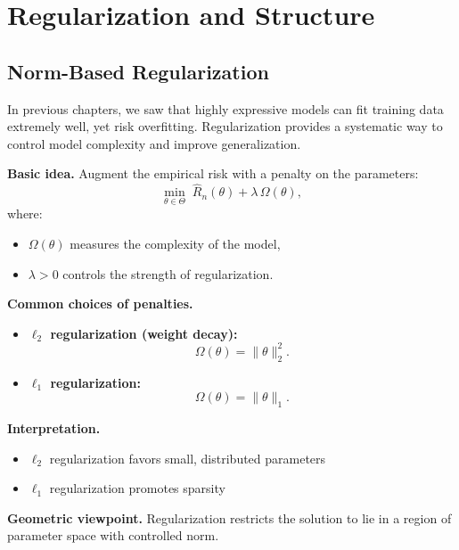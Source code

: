 \chapter{Regularization and Structure}

\section{Norm-Based Regularization}

In previous chapters, we saw that highly expressive models can fit training data extremely well, yet risk overfitting. Regularization provides a systematic way to control model complexity and improve generalization.

\medskip

\noindent
\textbf{Basic idea.}  
Augment the empirical risk with a penalty on the parameters:
\[
\min_{\theta \in \Theta} \; \hat{R}_n(\theta) + \lambda \, \Omega(\theta),
\]
where:
\begin{itemize}
    \item $\Omega(\theta)$ measures the complexity of the model,
    \item $\lambda > 0$ controls the strength of regularization.
\end{itemize}

\medskip

\noindent
\textbf{Common choices of penalties.}

\begin{itemize}
    \item \textbf{$\ell_2$ regularization (weight decay):}
    \[
    \Omega(\theta) = \|\theta\|_2^2.
    \]

    \item \textbf{$\ell_1$ regularization:}
    \[
    \Omega(\theta) = \|\theta\|_1.
    \]
\end{itemize}

\medskip

\noindent
\textbf{Interpretation.}
\begin{itemize}
    \item $\ell_2$ regularization favors small, distributed parameters
    \item $\ell_1$ regularization promotes sparsity
\end{itemize}

\medskip

\noindent
\textbf{Geometric viewpoint.}  
Regularization restricts the solution to lie in a region of parameter space with controlled norm.

